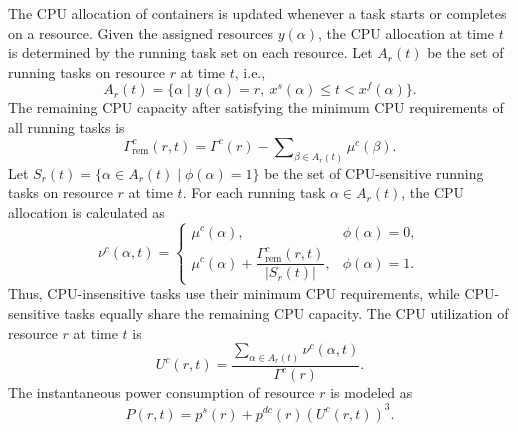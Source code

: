 \documentclass[10pt,journal]{IEEEtran}
\begin{document}
The CPU allocation of containers is updated whenever a task starts or completes on a resource. Given the assigned resources $y(\alpha)$, the CPU allocation at time $t$ is determined by the running task set on each resource.
Let $A_r(t)$ be the set of running tasks on resource $r$ at time $t$, i.e.,
\begin{equation}
    A_r(t)=
    \{\alpha\mid y(\alpha)=r,~x^s(\alpha)\leq t<x^f(\alpha)\}.
    \label{Eq: running set}
\end{equation}
The remaining CPU capacity after satisfying the minimum CPU requirements of all running tasks is
\begin{equation}
    \Gamma_{\mathrm{rem}}^c(r,t)=
    \Gamma^c(r)
    -
    \sum\nolimits_{\beta\in A_r(t)}
    \mu^c(\beta).
    \label{Eq: remaining cpu}
\end{equation}
Let $S_r(t)= \{\alpha\in A_r(t)\mid \phi(\alpha)=1\}$ be the set of CPU-sensitive running tasks on resource $r$ at time $t$.
For each running task $\alpha\in A_r(t)$, the CPU allocation is calculated as
\begin{equation}
    \nu^c(\alpha,t)=
    \begin{cases}
        \mu^c(\alpha),
        & \phi(\alpha)=0,\\[4pt]
        \mu^c(\alpha)+
        \dfrac{\Gamma_{\mathrm{rem}}^c(r,t)}{|S_r(t)|},
        & \phi(\alpha)=1.
    \end{cases}
    \label{Eq: cpu allocation}
\end{equation}
Thus, CPU-insensitive tasks use their minimum CPU requirements, while CPU-sensitive tasks equally share the remaining CPU capacity.
The CPU utilization of resource $r$ at time $t$ is
\begin{equation}
    U^c(r,t)=
    \frac{
    \sum_{\alpha\in A_r(t)}
    \nu^c(\alpha,t)}
    {\Gamma^c(r)}.
    \label{Eq: Utilization at time t}
\end{equation}
The instantaneous power consumption of resource $r$ is modeled as
\begin{equation}
    P(r,t)=
    p^s(r)+p^{dc}(r)\left(U^c(r,t)\right)^3.
    \label{Eq: power at time t}
\end{equation}
\end{document}
